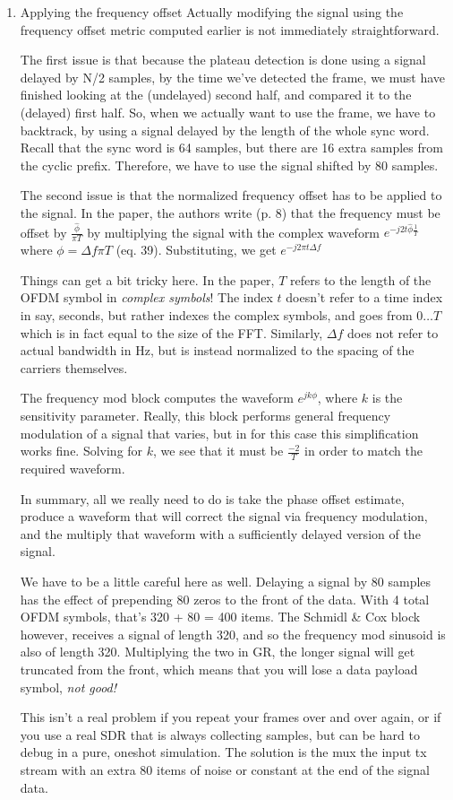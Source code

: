 \documentclass[11pt]{article}
\begin{document}
\begin{enumerate}
\item Applying the frequency offset
\label{sec:org5a21490}
Actually modifying the signal using the frequency offset metric
computed earlier is not immediately straightforward.

The first issue is that because the plateau detection is done using a
signal delayed by N/2 samples, by the time we've detected the frame,
we must have finished looking at the (undelayed) second half, and
compared it to the (delayed) first half. So, when we actually want to
use the frame, we have to backtrack, by using a signal delayed by the
length of the whole sync word. Recall that the sync word is 64
samples, but there are 16 extra samples from the cyclic
prefix. Therefore, we have to use the signal shifted by 80 samples.

The second issue is that the normalized frequency offset has to be
applied to the signal. In the paper, the authors write (p. 8) that the
frequency must be offset by \(\frac{\hat{\phi}}{\pi T}\) by multiplying the
signal with the complex waveform \(e^{-j2t\hat{\phi}\frac{1}{T}}\) where
\(\phi = \Delta f \pi T\) (eq. 39). Substituting, we get \(e^{-j2\pi t
\Delta f}\)

Things can get a bit tricky here. In the paper, \(T\) refers to the
length of the OFDM symbol in \emph{complex symbols}! The index \(t\) doesn't
refer to a time index in say, seconds, but rather indexes the complex
symbols, and goes from \(0 \dots T\) which is in fact equal to the size
of the FFT. Similarly, \(\Delta f\) does not refer to actual bandwidth
in Hz, but is instead normalized to the spacing of the carriers
themselves.

The frequency mod block computes the waveform \(e^{jk\phi}\), where \(k\)
is the sensitivity parameter. Really, this block performs general frequency
modulation of a signal that varies, but in for this case this
simplification works fine. Solving for \(k\), we see that it must be
\(\frac{-2}{T}\) in order to match the required waveform.

In summary, all we really need to do is take the phase offset
estimate, produce a waveform that will correct the signal via
frequency modulation, and the multiply that waveform with a
sufficiently delayed version of the signal.

We have to be a little careful here as well. Delaying a signal by 80
samples has the effect of prepending 80 zeros to the front of the
data. With 4 total OFDM symbols, that's 320 + 80 = 400 items. The
Schmidl \& Cox block however, receives a signal of length 320, and so
the frequency mod sinusoid is also of length 320. Multiplying the two
in GR, the longer signal will get truncated from the front, which
means that you will lose a data payload symbol, \emph{not good!}

This isn't a real problem if you repeat your frames over and over
again, or if you use a real SDR that is always collecting samples, but
can be hard to debug in a pure, oneshot simulation. The solution is
the mux the input tx stream with an extra 80 items of noise or
constant at the end of the signal data.
\end{enumerate}
\end{document}
